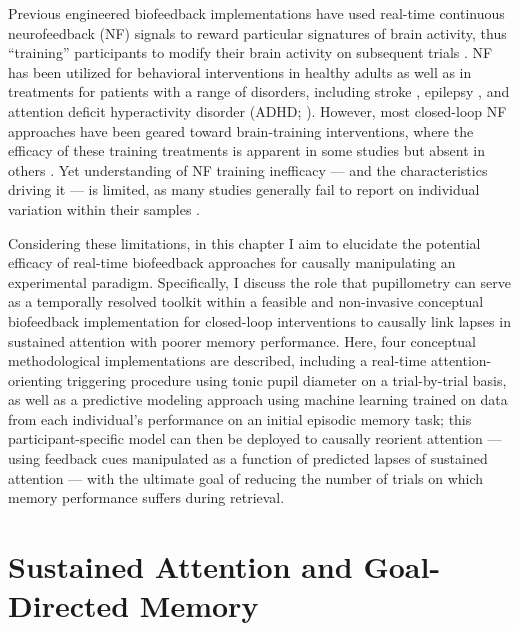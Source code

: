 Previous engineered biofeedback implementations have used real-time continuous neurofeedback (NF) signals to reward particular signatures of brain activity, thus \enquote{training} participants to modify their brain activity on subsequent trials \parencite{alkoby2018can}. NF has been utilized for behavioral interventions in healthy adults \parencite{hoedlmoser2008instrumental,zoefel2011neurofeedback,wang2013neurofeedback,gruzelier2014eegA,gruzelier2014eegB} as well as in treatments for patients with a range of disorders, including stroke \parencite{rayegani2014effect,doppelmayr2007attempt}, epilepsy \parencite{kotchoubey2001modification,walker2005neurofeedback,sterman2006foundation,tan2009meta,strehl2014sustained}, and attention deficit hyperactivity disorder (ADHD; \cite{thompson2005neurofeedback,leins2007neurofeedback,arns2009efficacy,sonuga2013nonpharmacological}). However, most closed-loop NF approaches have been geared toward brain-training interventions, where the efficacy of these training treatments is apparent in some studies but absent in others \parencite{alkoby2018can,weber2011predicting}. Yet understanding of NF training inefficacy --- and the characteristics driving it --- is limited, as many studies generally fail to report on individual variation within their samples \parencite{alkoby2018can}.

Considering these limitations, in this chapter I aim to elucidate the potential efficacy of real-time biofeedback approaches for causally manipulating an experimental paradigm. Specifically, I discuss the role that pupillometry can serve as a temporally resolved toolkit within a feasible and non-invasive conceptual biofeedback implementation for closed-loop interventions to causally link lapses in sustained attention with poorer memory performance. Here, four conceptual methodological implementations are described, including a real-time attention-orienting triggering procedure using tonic pupil diameter on a trial-by-trial basis, as well as a predictive modeling approach using machine learning trained on data from each individual's performance on an initial episodic memory task; this participant-specific model can then be deployed to causally reorient attention --- using feedback cues manipulated as a function of predicted lapses of sustained attention --- with the ultimate goal of reducing the number of trials on which memory performance suffers during retrieval.

\section{Sustained Attention and Goal-Directed Memory}

